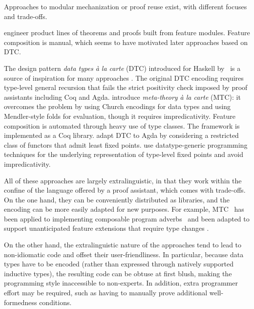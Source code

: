Approaches to modular mechanization or proof reuse exist,
with different focuses and trade-offs.


\citet{delaware2011} engineer product lines of theorems and proofs built
from feature modules. Feature composition is manual, which seems to have
motivated later approaches based on DTC.

The design pattern \emph{data types à la carte} (DTC) introduced for Haskell by~\citet{dtc}
is a source of inspiration for many approaches
\cite{delaware2013,delaware2013b,schwaab2013modular,keuchel2013generic,forsta2020}.
The original DTC encoding requires type-level general recursion that
fails the strict positivity check imposed by proof assistants including Coq and Agda.
\citet{delaware2013} introduce \emph{meta-theory à la carte} (MTC):
it overcomes the problem by using Church encodings for
data types and using Mendler-style folds for evaluation,
though it requires  impredicativity.
Feature composition is automated through heavy use of type classes.
The framework is implemented as a Coq library.
\citet{schwaab2013modular} adapt DTC to Agda by considering a restricted
class of functors that admit least fixed points.
\citet{keuchel2013generic} use datatype-generic programming techniques
for the underlying representation of type-level fixed points and
avoid  impredicativity.

All of these approaches are largely extra\-linguistic, in that they work
within the confine of the language offered by a proof assistant, which
comes with trade-offs.
On the one hand,
they can be conveniently distributed as libraries, and the encoding can
be more easily adapted for new purposes.
For example, MTC~\cite{delaware2013} has been applied to implementing
composable program adverbs~\cite{liwei2022} and been adapted to support
unanticipated feature extensions that require type changes
\cite{delaware2013b}.

On the other hand, the extra\-linguistic nature of the approaches tend
to lead to non-idiomatic code and offset their user-friendliness.
In particular, because data types have to be encoded (rather than expressed
through natively supported inductive types), the resulting code can be
obtuse at first blush, making the programming style inaccessible to non-experts.
In addition, extra programmer effort may be required, such as
having to manually prove additional well-formedness conditions. %

